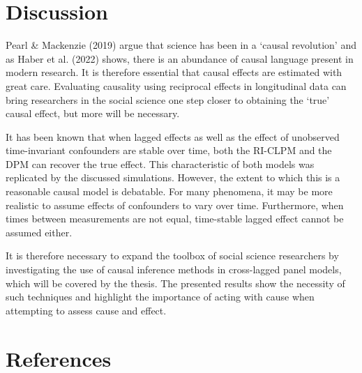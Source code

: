 \documentclass[
]{interact}
\begin{document}
\hypertarget{discussion}{%
\section{Discussion}\label{discussion}}

Pearl \& Mackenzie (2019) argue that science has been in a `causal
revolution' and as Haber et al. (2022) shows, there is an abundance of
causal language present in modern research. It is therefore essential
that causal effects are estimated with great care. Evaluating causality
using reciprocal effects in longitudinal data can bring researchers in
the social science one step closer to obtaining the `true' causal
effect, but more will be necessary.

It has been known that when lagged effects as well as the effect of
unobserved time-invariant confounders are stable over time, both the
RI-CLPM and the DPM can recover the true effect. This characteristic of
both models was replicated by the discussed simulations. However, the
extent to which this is a reasonable causal model is debatable. For many
phenomena, it may be more realistic to assume effects of confounders to
vary over time. Furthermore, when times between measurements are not
equal, time-stable lagged effect cannot be assumed either.

It is therefore necessary to expand the toolbox of social science
researchers by investigating the use of causal inference methods in
cross-lagged panel models, which will be covered by the thesis. The
presented results show the necessity of such techniques and highlight
the importance of acting with cause when attempting to assess cause and
effect.

\newpage{}

\hypertarget{references}{%
\section*{References}\label{references}}
\end{document}
